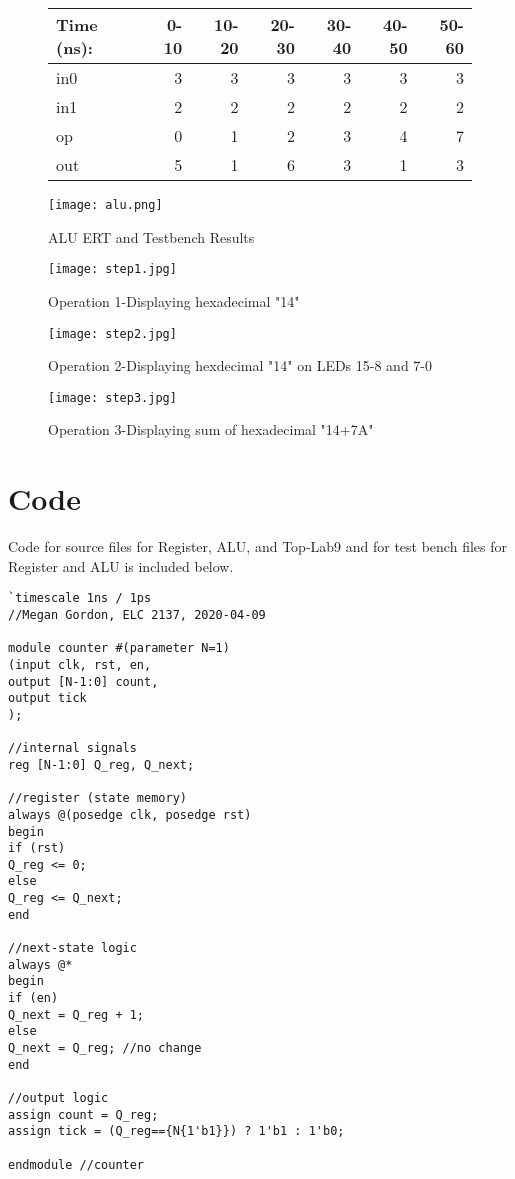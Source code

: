 \documentclass[11pt]{article}
\begin{document}
\begin{figure}[ht]\centering
	\begin{tabular}{l|rrrrrr}
		Time (ns): & 0-10 & 10-20 & 20-30 & 30-40 & 40-50 & 50-60 \\
		\midrule
		in0 & 3 & 3 & 3 & 3 & 3 & 3 \\
		in1 & 2 & 2 & 2 & 2 & 2 & 2 \\
		op & 0 & 1 & 2 & 3 & 4 & 7 \\
		\midrule
		out & 5 & 1 & 6 & 3 & 1 & 3 \\
		\bottomrule
	\end{tabular}\medskip
	
	\texttt{[image: alu.png]}
	\caption{ALU ERT and Testbench Results}
	\label{fig:sim_with_table}
\end{figure}


\clearpage

\begin{figure}[ht]\centering
	\texttt{[image: step1.jpg]}
	\caption{Operation 1-Displaying hexadecimal "14"}
	\label{fig:sim_with_table}
\end{figure}
\clearpage

\begin{figure}[ht]\centering
	\texttt{[image: step2.jpg]}
	\caption{Operation 2-Displaying hexdecimal "14" on LEDs 15-8 and 7-0}
	\label{fig:sim_with_table}
\end{figure}
\clearpage

\begin{figure}[ht]\centering
	\texttt{[image: step3.jpg]}
	\caption{Operation 3-Displaying sum of hexadecimal "14+7A"}
	\label{fig:sim_with_table}
\end{figure}
\clearpage





\section*{Code}

Code for source files for Register, ALU, and Top-Lab9 and for test bench files for Register and ALU is included below.

\begin{lstlisting}[style=Verilog,caption=Counter Code,label=code:ex ]
`timescale 1ns / 1ps
//Megan Gordon, ELC 2137, 2020-04-09

module counter #(parameter N=1)
(input clk, rst, en,
output [N-1:0] count,
output tick
);

//internal signals
reg [N-1:0] Q_reg, Q_next;

//register (state memory)
always @(posedge clk, posedge rst)
begin
if (rst)
Q_reg <= 0;
else
Q_reg <= Q_next;
end

//next-state logic
always @*
begin
if (en)
Q_next = Q_reg + 1;
else
Q_next = Q_reg; //no change
end

//output logic
assign count = Q_reg;
assign tick = (Q_reg=={N{1'b1}}) ? 1'b1 : 1'b0;

endmodule //counter
\end{lstlisting}
\end{document}
